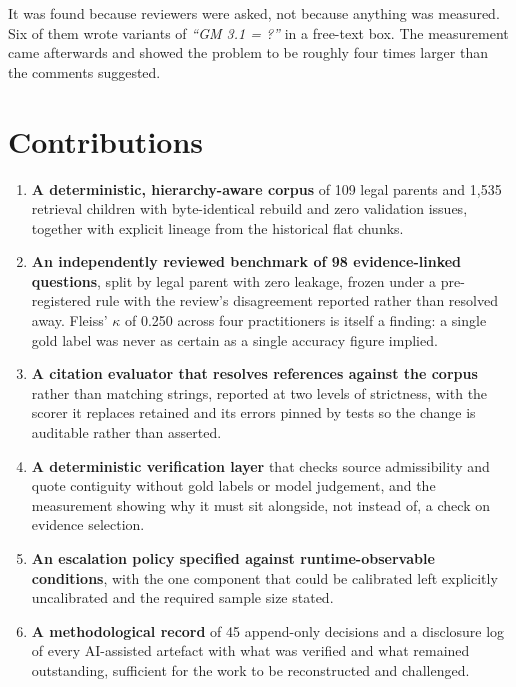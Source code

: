 It was found because reviewers were asked, not because anything was measured.
Six of them wrote variants of \emph{\enquote{GM 3.1 = ?}} in a free-text box. The
measurement came afterwards and showed the problem to be roughly four times
larger than the comments suggested.

\section{Contributions}

\begin{enumerate}
  \item \textbf{A deterministic, hierarchy-aware corpus} of 109 legal parents and
    1{,}535 retrieval children with byte-identical rebuild and zero validation
    issues, together with explicit lineage from the historical flat chunks.

  \item \textbf{An independently reviewed benchmark of 98 evidence-linked
    questions}, split by legal parent with zero leakage, frozen under a
    pre-registered rule with the review's disagreement reported rather than
    resolved away. Fleiss' $\kappa$ of 0.250 across four practitioners is itself
    a finding: a single gold label was never as certain as a single accuracy
    figure implied.

  \item \textbf{A citation evaluator that resolves references against the corpus}
    rather than matching strings, reported at two levels of strictness, with the
    scorer it replaces retained and its errors pinned by tests so the change is
    auditable rather than asserted.

  \item \textbf{A deterministic verification layer} that checks source
    admissibility and quote contiguity without gold labels or model judgement,
    and the measurement showing why it must sit alongside, not instead of, a
    check on evidence selection.

  \item \textbf{An escalation policy specified against runtime-observable
    conditions}, with the one component that could be calibrated left explicitly
    uncalibrated and the required sample size stated.

  \item \textbf{A methodological record} of 45 append-only decisions and a
    disclosure log of every AI-assisted artefact with what was verified and what
    remained outstanding, sufficient for the work to be reconstructed and
    challenged.
\end{enumerate}

